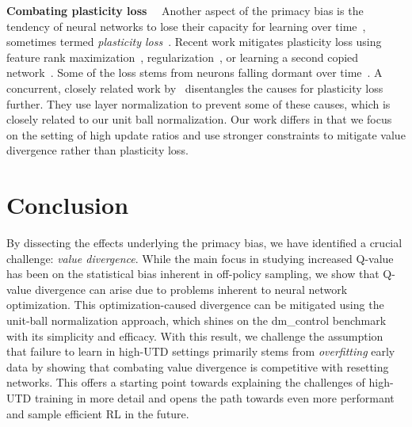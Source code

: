 {\bf Combating plasticity loss}~~ Another aspect of the primacy bias is the tendency of neural networks to lose their capacity for learning over time~\parencite{igl2021transient}, sometimes termed \emph{plasticity loss}~\parencite{lyle2021understanding, abbas2023loss}. Recent work mitigates plasticity loss using feature rank maximization~\parencite{kumar2021implicit}, regularization~\parencite{lyle2023understanding}, or learning a second copied network~\parencite{nikishin2024deep}. Some of the loss stems from neurons falling dormant over time~\parencite{sokar2023dormant}. A concurrent, closely related work by~\textcite{lyle2024disentangling} disentangles the causes for plasticity loss further. They use layer normalization to prevent some of these causes, which is closely related to our unit ball normalization. Our work differs in that we focus on the setting of high update ratios and use stronger constraints to mitigate value divergence rather than plasticity loss. 


\section{Conclusion}

By dissecting the effects underlying the primacy bias, we have identified a crucial challenge: \emph{value divergence}. 
While the main focus in studying increased Q-value has been on the statistical bias inherent in off-policy sampling, we show that Q-value divergence can arise due to problems inherent to neural network optimization.
This optimization-caused divergence can be mitigated using the unit-ball normalization approach, which shines on the \textsf{dm\_control} benchmark with its simplicity and efficacy. 
With this result, we challenge the assumption that failure to learn in high-UTD settings primarily stems from \emph{overfitting} early data by showing that combating value divergence is competitive with resetting networks. 
This offers a starting point towards explaining the challenges of high-UTD training in more detail and opens the path towards even more performant and sample efficient RL in the future.

